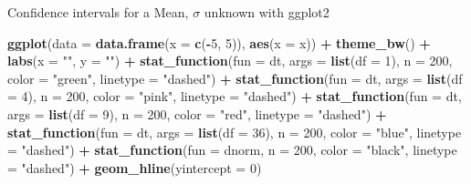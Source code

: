 \documentclass[
  ignorenonframetext,
]{beamer}
\newenvironment{Shaded}{\begin{snugshade}}{\end{snugshade}}
\newcommand{\AttributeTok}[1]{\textcolor[rgb]{0.13,0.29,0.53}{#1}}
\newcommand{\DecValTok}[1]{\textcolor[rgb]{0.00,0.00,0.81}{#1}}
\newcommand{\FunctionTok}[1]{\textcolor[rgb]{0.13,0.29,0.53}{\textbf{#1}}}
\newcommand{\NormalTok}[1]{#1}
\newcommand{\SpecialCharTok}[1]{\textcolor[rgb]{0.81,0.36,0.00}{\textbf{#1}}}
\newcommand{\StringTok}[1]{\textcolor[rgb]{0.31,0.60,0.02}{#1}}
\begin{document}
\begin{frame}[fragile]{Confidence intervals for a Mean, \(\sigma\)
unknown}
\protect\hypertarget{confidence-intervals-for-a-mean-sigma-unknown-5}{}
with ggplot2

\tiny

\begin{Shaded}
\begin{Highlighting}[]
\FunctionTok{ggplot}\NormalTok{(}\AttributeTok{data =} \FunctionTok{data.frame}\NormalTok{(}\AttributeTok{x =} \FunctionTok{c}\NormalTok{(}\SpecialCharTok{{-}}\DecValTok{5}\NormalTok{, }\DecValTok{5}\NormalTok{)), }\FunctionTok{aes}\NormalTok{(}\AttributeTok{x =}\NormalTok{ x)) }\SpecialCharTok{+} 
  \FunctionTok{theme\_bw}\NormalTok{() }\SpecialCharTok{+}
  \FunctionTok{labs}\NormalTok{(}\AttributeTok{x =} \StringTok{""}\NormalTok{, }\AttributeTok{y =} \StringTok{""}\NormalTok{) }\SpecialCharTok{+}
  \FunctionTok{stat\_function}\NormalTok{(}\AttributeTok{fun =}\NormalTok{ dt, }\AttributeTok{args =} \FunctionTok{list}\NormalTok{(}\AttributeTok{df =} \DecValTok{1}\NormalTok{), }\AttributeTok{n =} \DecValTok{200}\NormalTok{, }\AttributeTok{color =} \StringTok{"green"}\NormalTok{, }\AttributeTok{linetype =} \StringTok{"dashed"}\NormalTok{) }\SpecialCharTok{+} 
  \FunctionTok{stat\_function}\NormalTok{(}\AttributeTok{fun =}\NormalTok{ dt, }\AttributeTok{args =} \FunctionTok{list}\NormalTok{(}\AttributeTok{df =} \DecValTok{4}\NormalTok{), }\AttributeTok{n =} \DecValTok{200}\NormalTok{, }\AttributeTok{color =} \StringTok{"pink"}\NormalTok{, }\AttributeTok{linetype =} \StringTok{"dashed"}\NormalTok{) }\SpecialCharTok{+} 
  \FunctionTok{stat\_function}\NormalTok{(}\AttributeTok{fun =}\NormalTok{ dt, }\AttributeTok{args =} \FunctionTok{list}\NormalTok{(}\AttributeTok{df =} \DecValTok{9}\NormalTok{), }\AttributeTok{n =} \DecValTok{200}\NormalTok{, }\AttributeTok{color =} \StringTok{"red"}\NormalTok{, }\AttributeTok{linetype =} \StringTok{"dashed"}\NormalTok{) }\SpecialCharTok{+} 
  \FunctionTok{stat\_function}\NormalTok{(}\AttributeTok{fun =}\NormalTok{ dt, }\AttributeTok{args =} \FunctionTok{list}\NormalTok{(}\AttributeTok{df =} \DecValTok{36}\NormalTok{), }\AttributeTok{n =} \DecValTok{200}\NormalTok{, }\AttributeTok{color =} \StringTok{"blue"}\NormalTok{, }\AttributeTok{linetype =} \StringTok{"dashed"}\NormalTok{) }\SpecialCharTok{+} 
  \FunctionTok{stat\_function}\NormalTok{(}\AttributeTok{fun =}\NormalTok{ dnorm, }\AttributeTok{n =} \DecValTok{200}\NormalTok{, }\AttributeTok{color =} \StringTok{"black"}\NormalTok{, }\AttributeTok{linetype =} \StringTok{"dashed"}\NormalTok{) }\SpecialCharTok{+}
  \FunctionTok{geom\_hline}\NormalTok{(}\AttributeTok{yintercept =} \DecValTok{0}\NormalTok{)}
\end{Highlighting}
\end{Shaded}


\end{frame}
\end{document}
